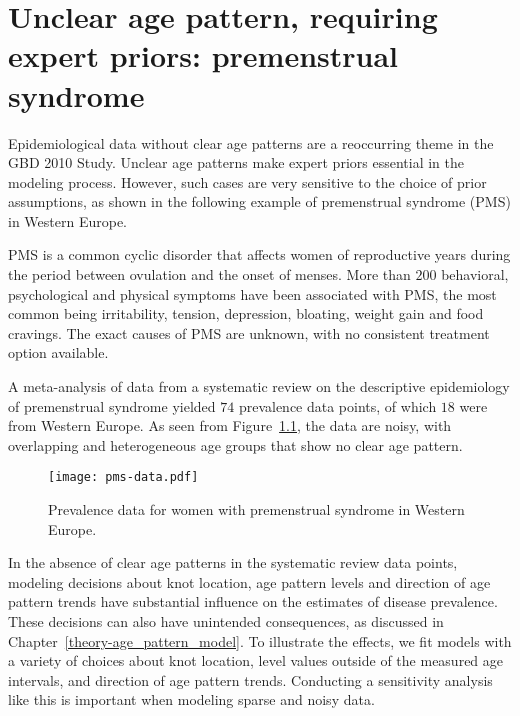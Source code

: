 \chapter{Unclear age pattern, requiring expert priors: premenstrual syndrome}
\label{applications-priors_knots_select}

Epidemiological data without clear age patterns are a reoccurring
theme in the GBD 2010 Study.  Unclear age patterns make expert priors
essential in the modeling process.  However, such cases are very
sensitive to the choice of prior assumptions, as shown in the
following example of premenstrual syndrome (PMS) in Western Europe.

PMS is a common cyclic disorder that affects women of reproductive
years during the period between ovulation and the onset of menses.
More than $200$ behavioral, psychological and physical symptoms have been
associated with PMS, the most common being irritability, tension,
depression, bloating, weight gain and food cravings.  The exact causes
of PMS are unknown, with no consistent
treatment option available. \cite{dickerson_premenstrual_2003, singh_incidence_1998,
  goodale_alleviation_1990}

A meta-analysis of data from a systematic review on the descriptive
epidemiology of premenstrual syndrome yielded $74$ prevalence
data points, of which $18$ were from Western Europe.  As seen from
Figure~\ref{fig:app-pms_data}, the data are noisy, with overlapping and
heterogeneous age groups that show no clear age pattern.

    \begin{figure}[h]
        \begin{center}
            \texttt{[image: pms-data.pdf]}
            \caption{Prevalence data for women with premenstrual
              syndrome in Western Europe.}
        \end{center}
        \label{fig:app-pms_data}
    \end{figure}


In the absence of clear age patterns in the systematic review data
points, modeling decisions about knot location, age pattern levels and
direction of age pattern trends have substantial influence on the estimates of
disease prevalence.  These decisions can also have unintended
consequences, as discussed in Chapter~\ref{theory-age_pattern_model}.
To illustrate the effects, we fit models with a variety of choices
about knot location, level values outside of the measured age
intervals, and direction of age pattern trends.  Conducting a sensitivity analysis
like this is important when modeling sparse and noisy data.

